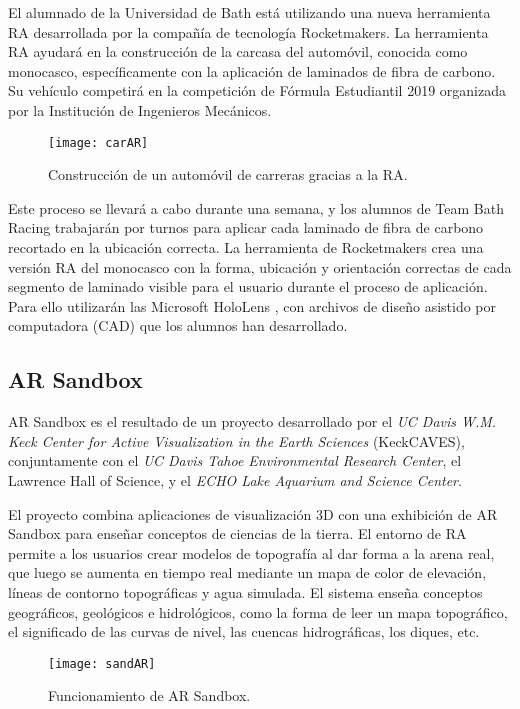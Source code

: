 El alumnado de la Universidad de Bath está utilizando una nueva herramienta RA desarrollada por la compañía de tecnología Rocketmakers. 
La herramienta RA ayudará en la construcción de la carcasa del automóvil, conocida como monocasco, específicamente con la aplicación de laminados de fibra de carbono. 
Su vehículo competirá en la competición de Fórmula Estudiantil 2019 organizada por la Institución de Ingenieros Mecánicos.

\begin{figure}[h]
    \centering
    \texttt{[image: carAR]}
    \caption{Construcción de un automóvil de carreras gracias a la RA.}
    \label{fig:xyz}
\end{figure}    

Este proceso se llevará a cabo durante una semana, y los alumnos de Team Bath Racing trabajarán por turnos para aplicar cada laminado de fibra de carbono recortado en la ubicación correcta. La herramienta de Rocketmakers crea una versión RA del monocasco con la forma, ubicación y orientación correctas de cada segmento de laminado visible para el usuario durante el proceso de aplicación. Para ello utilizarán las Microsoft HoloLens \cite{URL::hololens}, con archivos de diseño asistido por computadora (CAD) que los alumnos han desarrollado.

 

\subsection{AR Sandbox} 
AR Sandbox \cite{URL::sandbox} es el resultado de un proyecto desarrollado por 
el \textit{UC Davis W.M. Keck Center for Active Visualization in the Earth Sciences} (KeckCAVES), 
conjuntamente con el \textit{UC Davis Tahoe Environmental Research Center}, el Lawrence Hall of Science, y el \textit{ECHO Lake Aquarium and Science Center}.

El proyecto combina aplicaciones de visualización 3D con una exhibición de AR Sandbox para enseñar conceptos de ciencias de la tierra. 
El entorno de RA permite a los usuarios crear modelos de topografía al dar forma a la arena real, que luego se aumenta en tiempo real mediante un mapa de color de elevación, líneas de contorno topográficas y agua simulada. 
El sistema enseña conceptos geográficos, geológicos e hidrológicos, como la forma de leer un mapa topográfico, el significado de las curvas de nivel, las cuencas hidrográficas, los diques, etc.

\begin{figure}[h]
    \centering
    \texttt{[image: sandAR]}
    \caption{Funcionamiento de AR Sandbox.}
    \label{fig:xyz}
\end{figure}    







